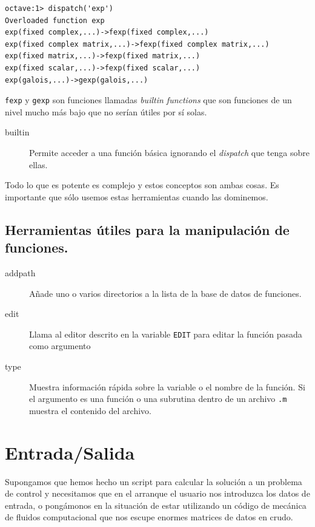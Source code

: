 \begin{lstlisting}
octave:1> dispatch('exp')
Overloaded function exp
exp(fixed complex,...)->fexp(fixed complex,...)
exp(fixed complex matrix,...)->fexp(fixed complex matrix,...)
exp(fixed matrix,...)->fexp(fixed matrix,...)
exp(fixed scalar,...)->fexp(fixed scalar,...)
exp(galois,...)->gexp(galois,...)
\end{lstlisting}
\texttt{fexp} y \texttt{gexp} son funciones llamadas \emph{builtin
  functions} que son funciones de un nivel mucho más bajo que no
serían útiles por sí solas.

\begin{description}
\item [builtin]Permite acceder a una función básica
  ignorando el \emph{dispatch} que tenga sobre ellas.
\end{description}
Todo lo que es potente es complejo y estos conceptos son ambas cosas.
Es importante que sólo usemos estas herramientas cuando las dominemos.


\subsection{Herramientas útiles para la manipulación de funciones.}

\begin{description}
\item [addpath]Añade uno o varios directorios a la
  lista de la base de datos de funciones.
\item [edit]Llama al editor descrito en la variable
  \texttt{EDIT} para editar la función pasada como argumento
\item [type]Muestra información rápida sobre la variable o
  el nombre de la función. Si el argumento es una función o una
  subrutina dentro de un archivo \texttt{.m} muestra el contenido del
  archivo.
\end{description}

\section{Entrada/Salida}

Supongamos que hemos hecho un script para calcular la solución a un
problema de control y necesitamos que en el arranque el usuario nos
introduzca los datos de entrada, o pongámonos en la situación de estar
utilizando un código de mecánica de fluidos computacional que nos
escupe enormes matrices de datos en crudo.

